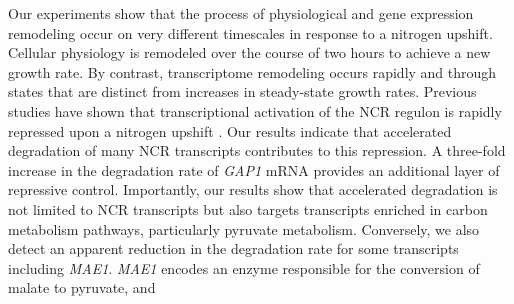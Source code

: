 Our experiments show that the process of physiological and gene
expression remodeling occur on very different timescales in response
to a nitrogen upshift. Cellular physiology is remodeled over the
course of two hours to achieve a new growth rate.
By contrast, transcriptome remodeling occurs rapidly and through
states that are distinct
from increases in steady-state growth rates. 
Previous studies have shown that transcriptional activation of the NCR
regulon is rapidly repressed upon a nitrogen upshift
\parencite{airoldi2016steady}. Our
results indicate that accelerated degradation of 
many NCR transcripts \parencite{godard2007effect} contributes to this
repression. 
A three-fold increase in
the degradation rate of \textit{GAP1} mRNA provides an additional layer of
repressive control. Importantly, our results show that accelerated
degradation is not limited to NCR transcripts but also targets
transcripts enriched in carbon metabolism pathways, particularly
pyruvate metabolism. Conversely, we also detect an apparent reduction in the 
degradation rate for some transcripts 
including \textit{MAE1}. \textit{MAE1} encodes
an enzyme responsible for the conversion of malate to pyruvate, and

